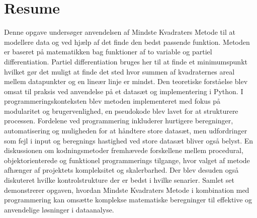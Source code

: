 \section*{Resume}
Denne opgave undersøger anvendelsen af Mindste Kvadraters Metode til at modellere data og ved hjælp af det finde den bedst passende funktion. Metoden er baseret på matematikken bag funktioner af to variable og partiel differentiation. Partiel differentiation bruges her til at finde et minimumspunkt hvilket gør det muligt at finde det sted hvor summen af kvadraternes areal mellem datapunkter og en lineær linje er mindst. Den teoretiske forståelse blev omsat til praksis ved anvendelse på et datasæt og implementering i Python. I programmeringskonteksten blev metoden implementeret med fokus på modularitet og brugervenlighed, en pseudokode blev lavet for at strukturere processen. Fordelene ved programmering inkluderer hurtigere beregninger, automatisering og muligheden for at håndtere store datasæt, men udfordringer som fejl i input og beregnings hastighed ved store datasæt bliver også belyst. En diskussionen om kodningsmetoder fremhævede forskellene mellem procedural, objektorienterede og funktionel programmerings tilgange, hvor valget af metode afhænger af projektets kompleksitet og skalerbarhed. Der blev desuden også diskuteret hvilke kontrolstrukture der er bedst i hvilke senarier. Samlet set demonstrerer opgaven, hvordan Mindste Kvadraters Metode i kombination med programmering kan omsætte komplekse matematiske beregninger til effektive og anvendelige løsninger i dataanalyse. \newpage